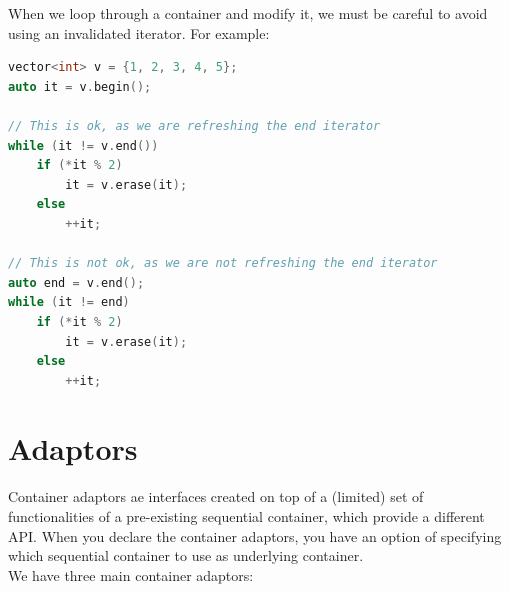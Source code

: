When we loop through a container and modify it, we must be careful to avoid using an invalidated
iterator. For example:\\

\begin{lstlisting}[language=C++]
vector<int> v = {1, 2, 3, 4, 5};
auto it = v.begin();

// This is ok, as we are refreshing the end iterator
while (it != v.end()) 
    if (*it % 2)
        it = v.erase(it);
    else
        ++it;

// This is not ok, as we are not refreshing the end iterator
auto end = v.end();
while (it != end)
    if (*it % 2)
        it = v.erase(it);
    else
        ++it;
\end{lstlisting}

\section{Adaptors}

Container adaptors ae interfaces created on top of a (limited) set of functionalities of a 
pre-existing sequential container, which provide a different API. When you declare the container
adaptors, you have an option of specifying which sequential container to use as underlying 
container.\\

We have three main container adaptors:

